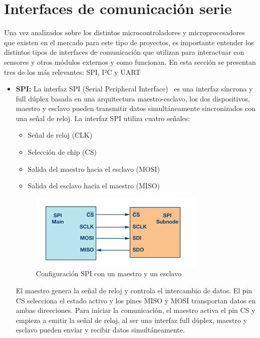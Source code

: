\section{Interfaces de comunicación serie}
Una vez analizados sobre los distintos microcontroladores y microprocesadores que existen en el mercado para este tipo de proyectos,
es importante entender los distintos tipos de interfaces de comunicación que utilizan para interactuar con sensores y otros módulos externos y como funcionan.
En esta sección se presentan tres de los más relevantes: SPI, I²C y UART

\begin{itemize}
    \item \textbf{SPI:} La interfaz SPI (Serial Peripheral Interface)~\cite{dhaker_spi} es una interfaz síncrona y full dúplex basada en una arquitectura maestro-esclavo,
    los dos dispositivos, maestro y esclavo pueden transmitir datos simultáneamente sincronizados con una señal de reloj.
    La interfaz SPI utiliza cuatro señales:
    \begin{itemize}
        \item Señal de reloj (CLK)
        \item Selección de chip (CS)
        \item Salida del maestro hacia el esclavo (MOSI)
        \item Salida del esclavo hacia el maestro (MISO)
    \end{itemize}
    \begin{figure}[h]
        \centering
        \includegraphics[width=0.8\textwidth]{Imagenes/Bitmap/spi}
        \caption{Configuración SPI con un maestro y un esclavo}
        \label{fig:spi}
    \end{figure}
    El maestro genera la señal de reloj y controla el intercambio de datos.
    El pin CS selecciona el estado activo y los pines MISO y MOSI transportan datos en ambas direcciones.
    Para iniciar la comunicación, el maestro activa el pin CS y empieza a emitir la señal de reloj, al ser una interfaz full dúplex,
    maestro y esclavo pueden enviar y recibir datos simultáneamente.

\end{itemize}
